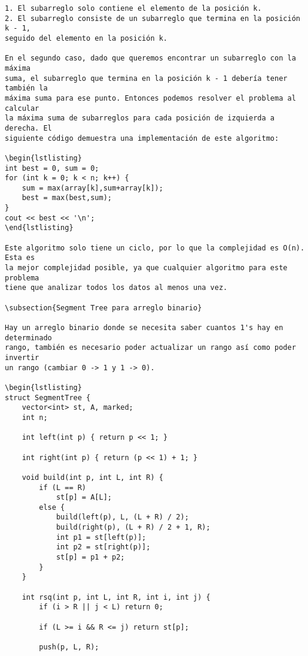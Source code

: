 \documentclass[11pt]{article}
\begin{document}
\begin{verbatim}
1. El subarreglo solo contiene el elemento de la posición k.
2. El subarreglo consiste de un subarreglo que termina en la posición k - 1,
seguido del elemento en la posición k.

En el segundo caso, dado que queremos encontrar un subarreglo con la máxima
suma, el subarreglo que termina en la posición k - 1 debería tener también la
máxima suma para ese punto. Entonces podemos resolver el problema al calcular
la máxima suma de subarreglos para cada posición de izquierda a derecha. El
siguiente código demuestra una implementación de este algoritmo:

\begin{lstlisting}
int best = 0, sum = 0;
for (int k = 0; k < n; k++) {
    sum = max(array[k],sum+array[k]);
    best = max(best,sum);
}
cout << best << '\n';
\end{lstlisting}

Este algoritmo solo tiene un ciclo, por lo que la complejidad es O(n). Esta es
la mejor complejidad posible, ya que cualquier algoritmo para este problema
tiene que analizar todos los datos al menos una vez.

\subsection{Segment Tree para arreglo binario}

Hay un arreglo binario donde se necesita saber cuantos 1's hay en determinado
rango, también es necesario poder actualizar un rango así como poder invertir
un rango (cambiar 0 -> 1 y 1 -> 0).

\begin{lstlisting}
struct SegmentTree {
    vector<int> st, A, marked;
    int n;

    int left(int p) { return p << 1; }

    int right(int p) { return (p << 1) + 1; }

    void build(int p, int L, int R) {
        if (L == R)
            st[p] = A[L];
        else {
            build(left(p), L, (L + R) / 2);
            build(right(p), (L + R) / 2 + 1, R);
            int p1 = st[left(p)];
            int p2 = st[right(p)];
            st[p] = p1 + p2;
        }
    }

    int rsq(int p, int L, int R, int i, int j) {
        if (i > R || j < L) return 0;

        if (L >= i && R <= j) return st[p];

        push(p, L, R);


\end{verbatim}
\end{document}
